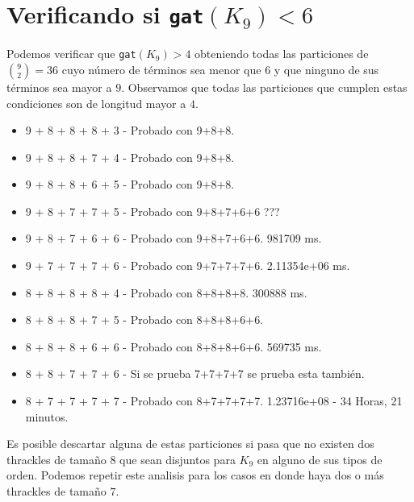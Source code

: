 \documentclass[12pt, letterpaper]{article}
\begin{document}
\section{Verificando si \texttt{gat}$(K_9) < 6$}
Podemos verificar que \texttt{gat}$(K_9) > 4$ obteniendo todas las particiones de $\binom{9}{2} = 36$ cuyo
número de términos sea menor que $6$ y que ninguno de sus términos sea mayor a $9$.
Observamos que todas las particiones que cumplen estas condiciones son de longitud mayor a $4$.
\begin{itemize}
  \item 9 + 8 + 8 + 8 + 3 - Probado con 9+8+8.
  \item 9 + 8 + 8 + 7 + 4 - Probado con 9+8+8.
  \item 9 + 8 + 8 + 6 + 5 - Probado con 9+8+8.
  \item 9 + 8 + 7 + 7 + 5 - Probado con 9+8+7+6+6 ???
  \item 9 + 8 + 7 + 6 + 6 - Probado con 9+8+7+6+6. 981709 ms.
  \item 9 + 7 + 7 + 7 + 6 - Probado con 9+7+7+7+6. 2.11354e+06 ms.
  \item 8 + 8 + 8 + 8 + 4 - Probado con 8+8+8+8. 300888 ms.
  \item 8 + 8 + 8 + 7 + 5 - Probado con 8+8+8+6+6.
  \item 8 + 8 + 8 + 6 + 6 - Probado con 8+8+8+6+6. 569735 ms.
  \item 8 + 8 + 7 + 7 + 6 - Si se prueba 7+7+7+7 se prueba esta también.
  \item 8 + 7 + 7 + 7 + 7 - Probado con 8+7+7+7+7. 1.23716e+08 - 34 Horas, 21 minutos.
\end{itemize}

Es posible descartar alguna de estas particiones si pasa que no existen dos thrackles de tamaño $8$ que sean disjuntos
para $K_9$ en alguno de sus tipos de orden. Podemos repetir este analisis para los casos en donde haya dos o más thrackles
de tamaño $7$.
\end{document}

